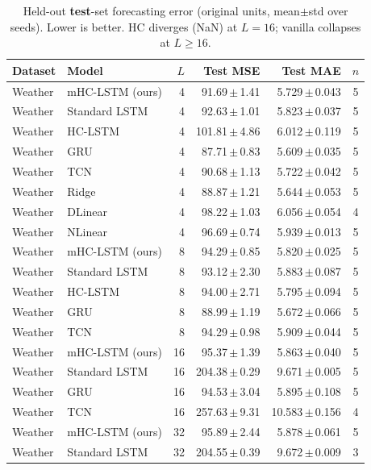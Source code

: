 \begin{table}[t]
\centering
\caption{Held-out \textbf{test}-set forecasting error (original units, mean$\pm$std over seeds). Lower is better. HC diverges (NaN) at $L{=}16$; vanilla collapses at $L{\geq}16$.}
\label{tab:main}
\footnotesize
\begin{tabular}{llrrrc}
\toprule
Dataset & Model & $L$ & Test MSE & Test MAE & $n$ \\
\midrule
Weather & mHC-LSTM (ours) & 4 & 91.69\,$\pm$\,1.41 & 5.729\,$\pm$\,0.043 & 5 \\
Weather & Standard LSTM & 4 & 92.63\,$\pm$\,1.01 & 5.823\,$\pm$\,0.037 & 5 \\
Weather & HC-LSTM & 4 & 101.81\,$\pm$\,4.86 & 6.012\,$\pm$\,0.119 & 5 \\
Weather & GRU & 4 & 87.71\,$\pm$\,0.83 & 5.609\,$\pm$\,0.035 & 5 \\
Weather & TCN & 4 & 90.68\,$\pm$\,1.13 & 5.722\,$\pm$\,0.042 & 5 \\
Weather & Ridge & 4 & 88.87\,$\pm$\,1.21 & 5.644\,$\pm$\,0.053 & 5 \\
Weather & DLinear & 4 & 98.22\,$\pm$\,1.03 & 6.056\,$\pm$\,0.054 & 4 \\
Weather & NLinear & 4 & 96.69\,$\pm$\,0.74 & 5.939\,$\pm$\,0.013 & 5 \\
Weather & mHC-LSTM (ours) & 8 & 94.29\,$\pm$\,0.85 & 5.820\,$\pm$\,0.025 & 5 \\
Weather & Standard LSTM & 8 & 93.12\,$\pm$\,2.30 & 5.883\,$\pm$\,0.087 & 5 \\
Weather & HC-LSTM & 8 & 94.00\,$\pm$\,2.71 & 5.795\,$\pm$\,0.094 & 5 \\
Weather & GRU & 8 & 88.99\,$\pm$\,1.19 & 5.672\,$\pm$\,0.066 & 5 \\
Weather & TCN & 8 & 94.29\,$\pm$\,0.98 & 5.909\,$\pm$\,0.044 & 5 \\
Weather & mHC-LSTM (ours) & 16 & 95.37\,$\pm$\,1.39 & 5.863\,$\pm$\,0.040 & 5 \\
Weather & Standard LSTM & 16 & 204.38\,$\pm$\,0.29 & 9.671\,$\pm$\,0.005 & 5 \\
Weather & GRU & 16 & 94.53\,$\pm$\,3.04 & 5.895\,$\pm$\,0.108 & 5 \\
Weather & TCN & 16 & 257.63\,$\pm$\,9.31 & 10.583\,$\pm$\,0.156 & 4 \\
Weather & mHC-LSTM (ours) & 32 & 95.89\,$\pm$\,2.44 & 5.878\,$\pm$\,0.061 & 5 \\
Weather & Standard LSTM & 32 & 204.55\,$\pm$\,0.39 & 9.672\,$\pm$\,0.009 & 3 \\

\end{tabular}
\end{table}
